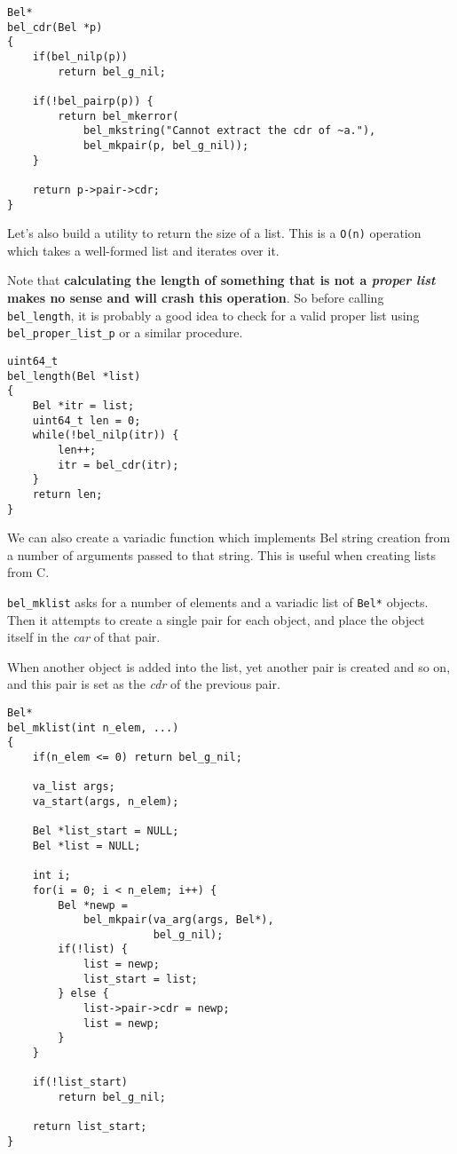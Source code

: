 \documentclass[openright,a4paper,twoside,12pt]{memoir}
\begin{document}
\begin{verbatim}
Bel*
bel_cdr(Bel *p)
{
    if(bel_nilp(p))
        return bel_g_nil;
    
    if(!bel_pairp(p)) {
        return bel_mkerror(
            bel_mkstring("Cannot extract the cdr of ~a."),
            bel_mkpair(p, bel_g_nil));
    }
    
    return p->pair->cdr;
}
\end{verbatim}

Let's also build a utility to return the size of a list. This is a
\texttt{O(n)} operation which takes a well-formed list and iterates over
it.

Note that \textbf{calculating the length of something that is not a \emph{proper
list} makes no sense and will crash this operation}. So before calling
\texttt{bel\_length}, it is probably a good idea to check for a valid proper
list using \texttt{bel\_proper\_list\_p} or a similar procedure.

\begin{verbatim}
uint64_t
bel_length(Bel *list)
{
    Bel *itr = list;
    uint64_t len = 0;
    while(!bel_nilp(itr)) {
        len++;
        itr = bel_cdr(itr);
    }
    return len;
}
\end{verbatim}

We can also create a variadic function which implements Bel string
creation from a number of arguments passed to that string. This is
useful when creating lists from C.

\texttt{bel\_mklist} asks for a number of elements and a variadic list of \texttt{Bel*}
objects. Then it attempts to create a single pair for each object, and
place the object itself in the \emph{car} of that pair.

When another object is added into the list, yet another pair is
created and so on, and this pair is set as the \emph{cdr} of the previous
pair.

\begin{verbatim}
Bel*
bel_mklist(int n_elem, ...)
{
    if(n_elem <= 0) return bel_g_nil;
    
    va_list args;
    va_start(args, n_elem);

    Bel *list_start = NULL;
    Bel *list = NULL;
    
    int i;
    for(i = 0; i < n_elem; i++) {
        Bel *newp =
            bel_mkpair(va_arg(args, Bel*),
                       bel_g_nil);
        if(!list) {
            list = newp;
            list_start = list;
        } else {
            list->pair->cdr = newp;
            list = newp;
        }
    }

    if(!list_start)
        return bel_g_nil;
    
    return list_start;
}
\end{verbatim}
\end{document}
